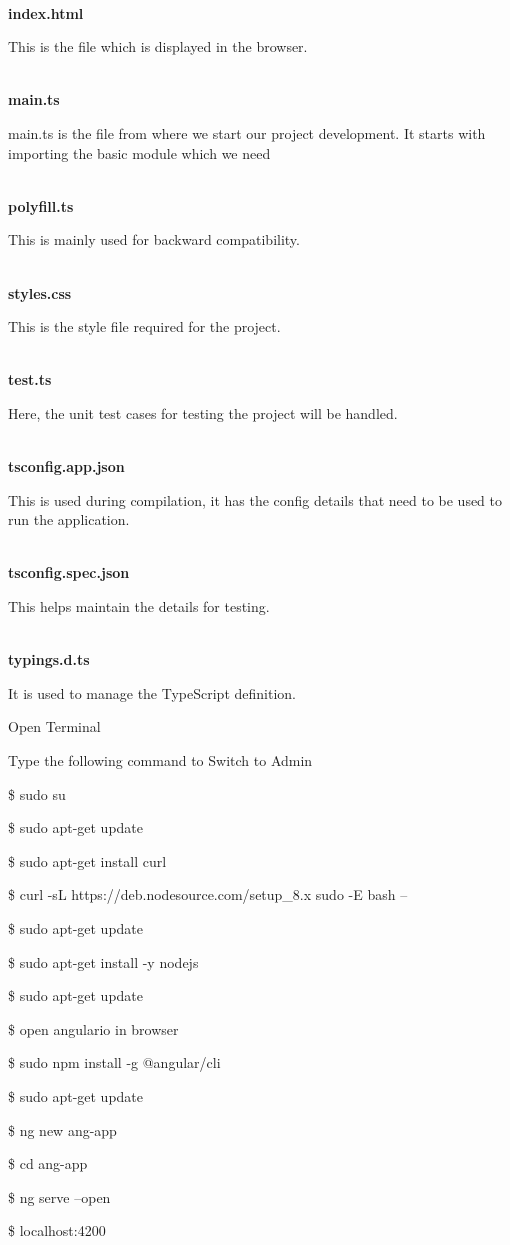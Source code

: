 \documentclass{article}
\begin{document}
\noindent \\ \textbf{index.html}

\noindent This is the file which is displayed in the browser.

\noindent \\ \textbf{main.ts}

\noindent main.ts is the file from where we start our project development. It starts with importing the basic module which we need

\noindent \\ \textbf{polyfill.ts}

\noindent This is mainly used for backward compatibility.

\noindent \\ \textbf{styles.css}

\noindent This is the style file required for the project.

\noindent \\ \textbf{test.ts}

\noindent Here, the unit test cases for testing the project will be handled.


\noindent \\ \textbf{tsconfig.app.json}

\noindent This is used during compilation, it has the config details that need to be used to run the application.\textbf{}

\noindent \\ \textbf{tsconfig.spec.json}

\noindent This helps maintain the details for testing.

\noindent \\ \textbf{typings.d.ts}

\noindent It is used to manage the TypeScript definition.

\newpage


\textbf{ }

\noindent Open Terminal

\noindent Type the following command to Switch to Admin


  \$ sudo su 


  \$ sudo apt-get update 


  \$ sudo apt-get install curl 


  \$ curl -sL https://deb.nodesource.com/setup\_8.x {\textbar} sudo -E bash -- 


  \$ sudo apt-get update 


  \$ sudo apt-get install -y nodejs 


  \$ sudo apt-get update 


  \$ open angulario in browser 


  \$ sudo npm install -g @angular/cli  


  \$ sudo apt-get update 


  \$ ng new ang-app  


  \$ cd ang-app  


  \$ ng serve --open  


  \$ localhost:4200 

 

\noindent 
\end{document}
